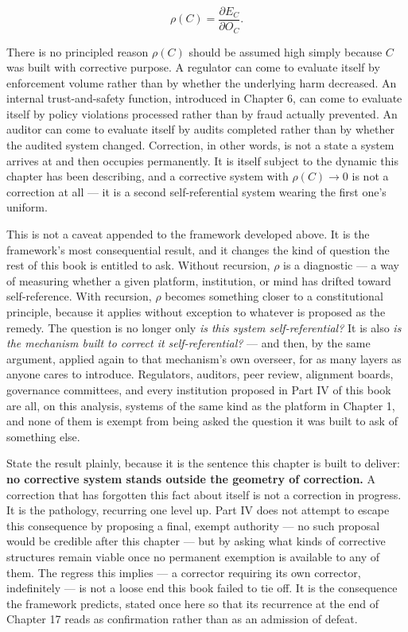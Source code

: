 \documentclass[12pt,a4paper]{book}
\begin{document}
\[\rho(C) = \frac{\partial E_C}{\partial O_C}.\]

There is no principled reason $\rho(C)$ should be assumed high simply because $C$ was built with corrective purpose. A regulator can come to evaluate itself by enforcement volume rather than by whether the underlying harm decreased. An internal trust-and-safety function, introduced in Chapter 6, can come to evaluate itself by policy violations processed rather than by fraud actually prevented. An auditor can come to evaluate itself by audits completed rather than by whether the audited system changed. Correction, in other words, is not a state a system arrives at and then occupies permanently. It is itself subject to the dynamic this chapter has been describing, and a corrective system with $\rho(C) \to 0$ is not a correction at all — it is a second self-referential system wearing the first one's uniform.

This is not a caveat appended to the framework developed above. It is the framework's most consequential result, and it changes the kind of question the rest of this book is entitled to ask. Without recursion, $\rho$ is a diagnostic — a way of measuring whether a given platform, institution, or mind has drifted toward self-reference. With recursion, $\rho$ becomes something closer to a constitutional principle, because it applies without exception to whatever is proposed as the remedy. The question is no longer only \emph{is this system self-referential?} It is also \emph{is the mechanism built to correct it self-referential?} — and then, by the same argument, applied again to that mechanism's own overseer, for as many layers as anyone cares to introduce. Regulators, auditors, peer review, alignment boards, governance committees, and every institution proposed in Part IV of this book are all, on this analysis, systems of the same kind as the platform in Chapter 1, and none of them is exempt from being asked the question it was built to ask of something else.

State the result plainly, because it is the sentence this chapter is built to deliver: \textbf{no corrective system stands outside the geometry of correction.} A correction that has forgotten this fact about itself is not a correction in progress. It is the pathology, recurring one level up. Part IV does not attempt to escape this consequence by proposing a final, exempt authority — no such proposal would be credible after this chapter — but by asking what kinds of corrective structures remain viable once no permanent exemption is available to any of them. The regress this implies — a corrector requiring its own corrector, indefinitely — is not a loose end this book failed to tie off. It is the consequence the framework predicts, stated once here so that its recurrence at the end of Chapter 17 reads as confirmation rather than as an admission of defeat.
\end{document}
